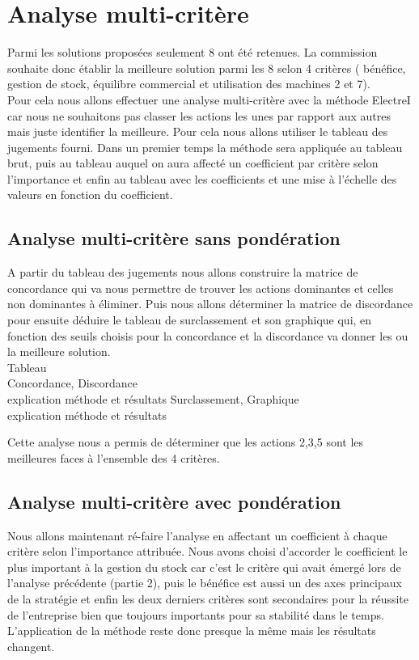 \documentclass{article}
\begin{document}
\section{Analyse multi-critère}
Parmi les solutions proposées seulement 8 ont été retenues. La commission souhaite donc établir la meilleure solution parmi les 8 selon 4 critères ( bénéfice, gestion de stock, équilibre commercial et utilisation des machines 2 et 7).\\

Pour cela nous allons effectuer une analyse multi-critère avec la méthode ElectreI car nous ne souhaitons pas classer les actions les unes par rapport aux autres mais juste identifier la meilleure. Pour cela nous allons utiliser le tableau des jugements fourni. Dans un premier temps la méthode sera appliquée au tableau brut, puis au tableau auquel on aura affecté un coefficient par critère selon l'importance et enfin au tableau avec les coefficients et une mise à l'échelle des valeurs en fonction du coefficient.\\ 

\subsection{Analyse multi-critère sans pondération}
A partir du tableau des jugements nous allons construire la matrice de concordance qui va nous permettre de trouver les actions dominantes et celles non dominantes à éliminer. Puis nous allons déterminer la matrice de discordance pour ensuite déduire le tableau de surclassement et son graphique qui, en fonction des seuils choisis pour la concordance et la discordance va donner les ou la meilleure solution.\\

Tableau\\
Concordance, Discordance\\ explication méthode et résultats
Surclassement, Graphique\\ explication méthode et résultats

Cette analyse nous a permis de déterminer que les actions 2,3,5 sont les meilleures faces à l'ensemble des 4 critères.

\subsection{Analyse multi-critère avec pondération}
Nous allons maintenant ré-faire l'analyse en affectant un coefficient à chaque critère selon l'importance attribuée. Nous avons choisi d'accorder le coefficient le plus important à la gestion du stock car c'est le critère qui avait émergé lors de l'analyse précédente (partie 2), puis le bénéfice est aussi un des axes principaux de la stratégie et enfin les deux derniers critères sont secondaires pour la réussite de l'entreprise bien que toujours importants pour sa stabilité dans le temps.
L'application de la méthode reste donc presque la même mais les résultats changent.\\
\end{document}
